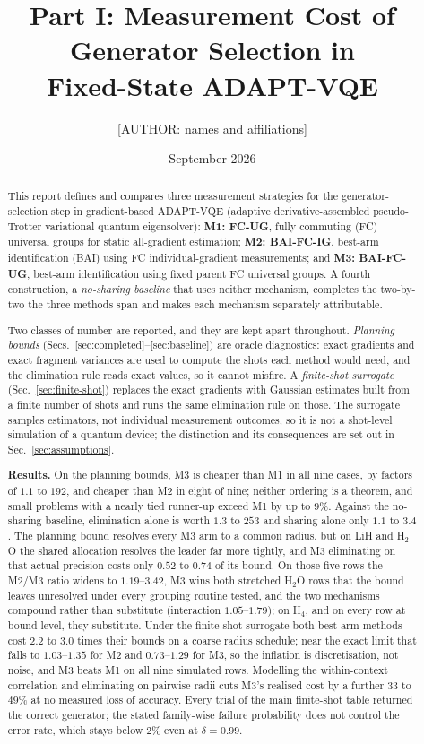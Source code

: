 \documentclass[10pt]{article}
\title{Part I: Measurement Cost of Generator Selection in\\Fixed-State ADAPT-VQE}
\author{[AUTHOR: names and affiliations]}
\date{September 2026}
\begin{document}
\maketitle

\begin{abstract}
This report defines and compares three measurement strategies for the generator-selection step in gradient-based ADAPT-VQE (adaptive derivative-assembled pseudo-Trotter variational quantum eigensolver): \textbf{M1: FC-UG}, fully commuting (FC) universal groups for static all-gradient estimation; \textbf{M2: BAI-FC-IG}, best-arm identification (BAI) using FC individual-gradient measurements; and \textbf{M3: BAI-FC-UG}, best-arm identification using fixed parent FC universal groups. A fourth construction, a \emph{no-sharing baseline} that uses neither mechanism, completes the two-by-two the three methods span and makes each mechanism separately attributable.

Two classes of number are reported, and they are kept apart throughout. \emph{Planning bounds} (Secs.~\ref{sec:completed}--\ref{sec:baseline}) are oracle diagnostics: exact gradients and exact fragment variances are used to compute the shots each method would need, and the elimination rule reads exact values, so it cannot misfire. A \emph{finite-shot surrogate} (Sec.~\ref{sec:finite-shot}) replaces the exact gradients with Gaussian estimates built from a finite number of shots and runs the same elimination rule on those. The surrogate samples estimators, not individual measurement outcomes, so it is not a shot-level simulation of a quantum device; the distinction and its consequences are set out in Sec.~\ref{sec:assumptions}.

\textbf{Results.} On the planning bounds, M3 is cheaper than M1 in all nine cases, by factors of $1.1$ to $192$, and cheaper than M2 in eight of nine; neither ordering is a theorem, and small problems with a nearly tied runner-up exceed M1 by up to $9\%$. Against the no-sharing baseline, elimination alone is worth $1.3$ to $253$ and sharing alone only $1.1$ to $3.4$. The planning bound resolves every M3 arm to a common radius, but on LiH and H$_2$O the shared allocation resolves the leader far more tightly, and M3 eliminating on that actual precision costs only $0.52$ to $0.74$ of its bound. On those five rows the M2/M3 ratio widens to $1.19$--$3.42$, M3 wins both stretched H$_2$O rows that the bound leaves unresolved under every grouping routine tested, and the two mechanisms compound rather than substitute (interaction $1.05$--$1.79$); on H$_4$, and on every row at bound level, they substitute. Under the finite-shot surrogate both best-arm methods cost $2.2$ to $3.0$ times their bounds on a coarse radius schedule; near the exact limit that falls to $1.03$--$1.35$ for M2 and $0.73$--$1.29$ for M3, so the inflation is discretisation, not noise, and M3 beats M1 on all nine simulated rows. Modelling the within-context correlation and eliminating on pairwise radii cuts M3's realised cost by a further $33$ to $49\%$ at no measured loss of accuracy. Every trial of the main finite-shot table returned the correct generator; the stated family-wise failure probability does not control the error rate, which stays below $2\%$ even at $\delta=0.99$.


\end{abstract}
\end{document}
